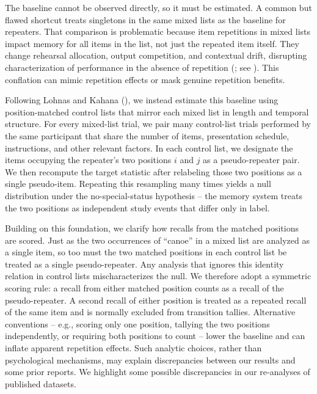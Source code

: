 \documentclass[
  man,
  floatsintext,
  longtable,
  nolmodern,
  notxfonts,
  notimes,
  draftfirst,
  colorlinks=true,linkcolor=blue,citecolor=blue,urlcolor=blue]{apa7}
\begin{document}
The baseline cannot be observed directly, so it must be estimated. A
common but flawed shortcut treats singletons in the same mixed lists as
the baseline for repeaters. That comparison is problematic because item
repetitions in mixed lists impact memory for all items in the list, not
just the repeated item itself. They change rehearsal allocation, output
competition, and contextual drift, disrupting characterization of
performance in the absence of repetition
(; see
). This
conflation can mimic repetition effects or mask genuine repetition
benefits.

Following Lohnas and Kahana (),
we instead estimate this baseline using position-matched control lists
that mirror each mixed list in length and temporal structure. For every
mixed-list trial, we pair many control-list trials performed by the same
participant that share the number of items, presentation schedule,
instructions, and other relevant factors. In each control list, we
designate the items occupying the repeater's two positions \(i\) and
\(j\) as a pseudo-repeater pair. We then recompute the target statistic
after relabeling those two positions as a single pseudo-item. Repeating
this resampling many times yields a null distribution under the
no-special-status hypothesis -- the memory system treats the two
positions as independent study events that differ only in label.

Building on this foundation, we clarify how recalls from the matched
positions are scored. Just as the two occurrences of ``canoe'' in a
mixed list are analyzed as a single item, so too must the two matched
positions in each control list be treated as a single pseudo-repeater.
Any analysis that ignores this identity relation in control lists
mischaracterizes the null. We therefore adopt a symmetric scoring rule:
a recall from either matched position counts as a recall of the
pseudo-repeater. A second recall of either position is treated as a
repeated recall of the same item and is normally excluded from
transition tallies. Alternative conventions -- e.g., scoring only one
position, tallying the two positions independently, or requiring both
positions to count -- lower the baseline and can inflate apparent
repetition effects. Such analytic choices, rather than psychological
mechanisms, may explain discrepancies between our results and some prior
reports. We highlight some possible discrepancies in our re-analyses of
published datasets.
\end{document}
